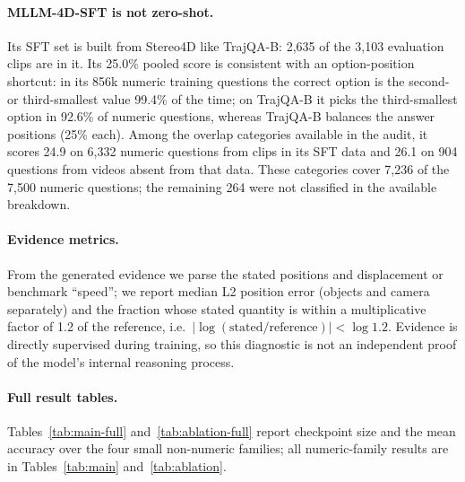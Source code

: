 \paragraph{MLLM-4D-SFT is not zero-shot.}
Its SFT set is built from Stereo4D like TrajQA-B: 2,635 of the 3,103 evaluation clips are in it.
Its 25.0\% pooled score is consistent with an option-position shortcut: in its 856k numeric training questions the correct option is the second- or third-smallest value 99.4\% of the time; on TrajQA-B it picks the third-smallest option in 92.6\% of numeric questions, whereas TrajQA-B balances the answer positions (25\% each).
Among the overlap categories available in the audit, it scores 24.9 on 6,332 numeric questions from clips in its SFT data and 26.1 on 904 questions from videos absent from that data. These categories cover 7,236 of the 7,500 numeric questions; the remaining 264 were not classified in the available breakdown.

\paragraph{Evidence metrics.}
From the generated evidence we parse the stated positions and displacement or benchmark ``speed''; we report median L2 position error (objects and camera separately) and the fraction whose stated quantity is within a multiplicative factor of 1.2 of the reference, i.e.\ $|\log(\text{stated}/\text{reference})|<\log 1.2$. Evidence is directly supervised during training, so this diagnostic is not an independent proof of the model's internal reasoning process.

\paragraph{Full result tables.}
Tables~\ref{tab:main-full} and~\ref{tab:ablation-full} report checkpoint size and the mean accuracy over the four small non-numeric families; all numeric-family results are in Tables~\ref{tab:main} and~\ref{tab:ablation}.

